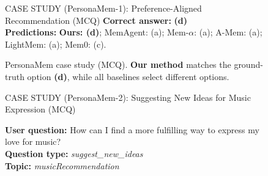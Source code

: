 \begin{figure}[!t]
\begin{AIboxRedFrame}{CASE STUDY (PersonaMem-1): Preference-Aligned Recommendation (MCQ)}
{\textbf{Correct answer:} \textbf{(d)} \\
\textbf{Predictions:} \textbf{Ours: (d)}; MemAgent: (a); Mem-$\alpha$: (a); A-Mem: (a); LightMem: (a); Mem0: (c).
}
\end{AIboxRedFrame}
\vspace{-1em}
\caption{PersonaMem case study (MCQ). \textbf{Our method} matches the ground-truth option \textbf{(d)}, while all baselines select different options.}
\label{fig:case_pm1_weekend}
\end{figure}

\begin{figure}[!t]
\begin{AIboxRedFrame}{CASE STUDY (PersonaMem-2): Suggesting New Ideas for Music Expression (MCQ)}
\vspace{1mm}
{\footnotesize
\setlength{\parindent}{0pt}
\setlength{\parskip}{2pt}

\textbf{User question:} How can I find a more fulfilling way to express my love for music? \\

\textbf{Question type:} \textit{suggest\_new\_ideas} \\

\textbf{Topic:} \textit{musicRecommendation} \\

}
\end{AIboxRedFrame}
\end{figure}
